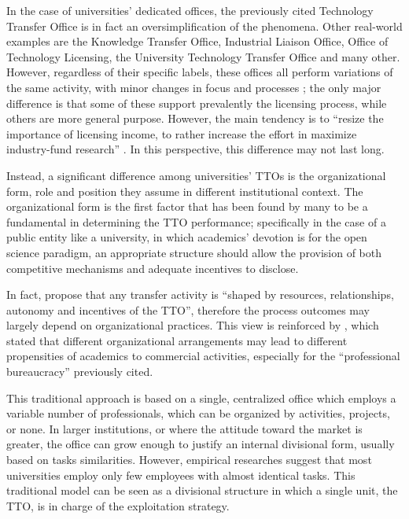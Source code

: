 In the case of universities' dedicated offices, the previously cited Technology Transfer Office is in fact an oversimplification of the phenomena. Other real-world examples are the Knowledge Transfer Office, Industrial Liaison Office, Office of Technology Licensing, the University Technology Transfer Office and many other. However, regardless of their specific labels, these offices all perform variations of the same activity, with minor changes in focus and processes \citep{Brescia2016}; the only major difference is that some of these support prevalently the licensing process, while others are more general purpose. However, the main tendency is to \enquote{resize the importance of licensing income, to rather increase the effort in maximize industry-fund research} \citep{Balderi2010}. In this perspective, this difference may not last long. 

Instead, a significant difference among universities' TTOs is the organizational form, role and position they assume in different institutional context. The organizational form is the first factor that has been found by many to be a fundamental in determining the TTO performance; specifically in the case of a public entity like a university, in which academics' devotion is for the open science paradigm, an appropriate structure should allow the provision of both competitive mechanisms and adequate incentives to disclose. 

In fact, \citet{Bercovitz2001} propose that any transfer activity is \enquote{shaped by resources, relationships, autonomy and incentives of the TTO}, therefore the process outcomes may largely depend on organizational practices. This view is reinforced by \citet{Debackere2005}, which stated that different organizational arrangements may lead to different propensities of academics to commercial activities, especially for the \enquote{professional bureaucracy} previously cited. 

This traditional approach is based on a single, centralized office which employs a variable number of professionals, which can be organized by activities, projects, or none. In larger institutions, or where the attitude toward the market is greater, the office can grow enough to justify an internal divisional form, usually based on tasks similarities. However, empirical researches suggest that most universities employ only few employees with almost identical tasks. This traditional model can be seen as a divisional structure in which a single unit, the TTO, is in charge of the exploitation strategy. 


